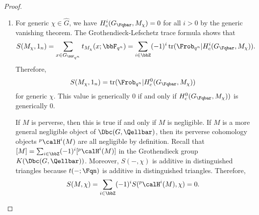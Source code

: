 \begin{proof}
\begin{enumerate}
        \item 
        For generic $\chi \in \widehat{G}$, we have $H_c^i(G_{\Fqbar}, M_\chi) = 0$ for all $i > 0$ by the generic vanishing theorem. The Grothendieck-Lefschetz trace formula shows that 
        $$S(M_\chi, 1_n) = \sum_{x \in G_{\bbF_{q^{n}}}} t_{M_\chi} (x;\bbF_{q^{n}}) = \sum_{i \in \bbZ} (-1)^i \operatorname{tr}(\Frob_{q^n} | H_c^i(G_{\Fqbar}, M_\chi)).$$
        Therefore, 
        $$S(M_\chi, 1_n) = \operatorname{tr}(\Frob_{q^n} | H_c^0(G_{\Fqbar}, M_\chi))$$
        for generic $\chi$. This value is generically $0$ if and only if $H_c^0(G_{\Fqbar}, M_\chi))$ is generically $0$.  

        If $M$ is perverse, then this is true if and only if $M$ is negligible. If $M$ is a more general negligible object of $\Dbc(G, \Qellbar)$, then its perverse cohomology objects ${}^p\calH^i(M)$ are all negligible by definition. Recall that $[M] = \sum_{i \in \bbZ} (-1)^i [{}^p\calH^i(M)]$ in the Grothendieck group $K(\Dbc(G, \Qellbar))$. Moreover, $S(-, \chi)$ is additive in distinguished triangles because $t(-; \Fqn)$ is additive in distinguished triangles. Therefore, 
        $$S(M,\chi) = \sum_{i \in \bbZ} (-1)^i S({}^p\calH^i(M), \chi) = 0.$$
    \end{enumerate}
\end{proof}

